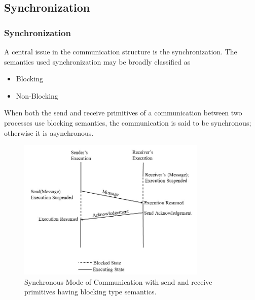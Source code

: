 \documentclass{beamer}
\begin{document}
\subsection{Synchronization}
\begin{frame}[allowframebreaks]
	\frametitle{Synchronization}
	A central issue in the communication structure is the synchronization. The semantics    
	used synchronization may be broadly classified as
	\begin{itemize}
		\item Blocking
		\item Non-Blocking
	\end{itemize}
	When both the send and receive primitives of a communication between two processes use 
	blocking semantics, the communication is said to be synchronous; otherwise it is 
	asynchronous.
	\vspace{2cm}
	\framebreak
	\begin{figure}
		\centering
		\includegraphics[width=9cm]{synchronousMode.jpg}
		\caption{Synchronous Mode of Communication with send and receive primitives having 
		blocking type semantics.}
	\end{figure}
\end{frame}
\end{document}

